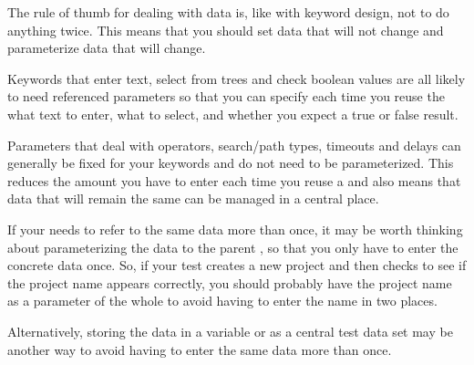 The rule of thumb for dealing with data is, like with keyword design, not to do anything twice. This means that you should set data that will not change and parameterize data that will change. 

Keywords that enter text, select from trees and check boolean values are all likely to need referenced parameters so that you can specify each time you reuse the \gdcase{} what text to enter, what to select, and whether you expect a true or false result. 

Parameters that deal with operators, search/path types, timeouts and delays can generally be fixed for your keywords and do not need to be parameterized. This reduces the amount you have to enter each time you reuse a \gdcase{} and also means that data that will remain the same can be managed in a central place. 


If your \gdcase{} needs to refer to the same data more than once, it may be worth thinking about parameterizing the data to the parent \gdcase{}, so that you only have to enter the concrete data once. So, if your test creates a new project and then checks to see if the project name appears correctly, you should probably have the project name as a parameter of the whole \gdcase{} to avoid having to enter the name in two places. 

Alternatively, storing the data in a variable or as a central test data set may be another way to avoid having to enter the same data more than once. 


